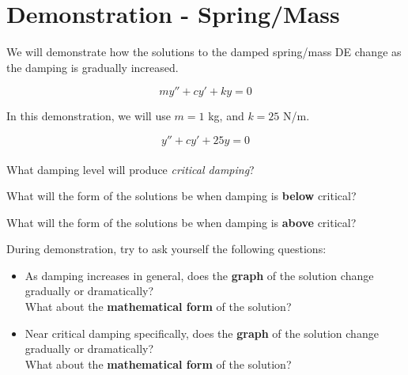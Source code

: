 



\newpage

\section*{Demonstration - Spring/Mass}

We will demonstrate how the solutions to the damped spring/mass DE
change as the damping is gradually increased.  

$$m y'' + c y' + k y  = 0$$

In this demonstration, we will use $m = 1$ kg, and $k = 25$ N/m.

\newpage

$$y'' + c y' + 25 y  = 0$$      \\[1ex]
\problem
  What damping level will produce {\em critical damping}?
\vfill

  What will the form of the solutions be when damping is {\bf below} critical?

\vfill
  What will the form of the solutions be when damping is {\bf above} critical?
\vfill
\newpage

During demonstration, try to ask yourself the following questions:
\begin{itemize}
\item As damping increases in general, does the {\bf graph} of the
  solution change gradually or dramatically?  \\What about the {\bf
    mathematical form} of the solution?
\item Near critical damping specifically, does the {\bf graph} of the
  solution change gradually or dramatically?  \\What about the {\bf
    mathematical form} of the solution?
\end{itemize}


